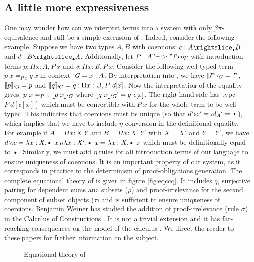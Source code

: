 \documentclass{llncs}
\def\figureshrink{0em}
\begin{document}
\subsection{A little more expressiveness}
One may wonder how can we interpret \Russell terms into a system with only
$\beta\pi$-equivalence and still be a simple extension of \CIC. 
Indeed, consider the following example. Suppose we have two types $A, B$
with coercions: $c : A \suba B$ and $d : B \suba A$. Additionally, let
$P : A "->" Prop$ with introduction terms $p : \Pi x : A, P~x$ and $q :
\Pi x : B, P~x$. Consider the following well-typed \Russell term $p~x
=_{P~x} q~x$ in context $`G = x : A$. By interpretation into \CIC, we
have $\llbracket P \rrbracket_{`G} = P$, $\llbracket p \rrbracket_{`G} = p$ and $\llbracket q \rrbracket_{`G} = q : \Pi x : B,
P~d[x]$. Now the interpretation of the equality gives:
$p~x =_{P~x} \llbracket q~x \rrbracket_{`G}$ where $\llbracket q~x \rrbracket_{`G} `= q~c[x]$. 
The right hand side has type $P~d[c[x]]$ which must be
convertible with $P~x$ for the whole term to be well-typed. This
indicates that coercions must be unique (so that $d `o c `= id_A `=
\ctxdot$), which implies that we have to include $\eta$ 
conversion in the definitional equality. For
example if $A = \Pi x : X.Y$ and $B = \Pi x : X'.Y'$ with $X = X'$ and
$Y = Y'$, we have $d `o c = \lambda x : X. \ctxdot~x `o \lambda x
: X'. \ctxdot~x = \lambda x : X. \ctxdot~x$ which must be definitionally
equal to $\ctxdot$.
Similarly, we must add $\eta$ rules for all introduction terms of our
language to ensure uniqueness of coercions. It is an important
property of our system, as it corresponds in practice to the determinism
of proof-obligations
generation. The complete equational theory of \CICq{} is given in figure
\vref{fig:eqccq}. It includes $\eta$, surjective pairing for dependent
sums and subsets ($\rho$) and proof-irrelevance for the second component
of subset objects ($\tau$) and is sufficient to ensure uniqueness of coercions.
Benjamin Werner has studied the addition of proof-irrelevance (rule
$\sigma$) in the Calculus of Constructions
\cite{Werner:ProofIrrelevance}. It is not a trivial extension and it has
far-reaching consequences on the model of the calculus
\cite{DBLP:conf/types/MiquelW02}. We direct the reader to these papers for further
information on the subject.
\begin{figure}[ht]
  \vspace{\figureshrink}
  \ccqeqarr
  \vspace{\figureshrink}
  \caption{Equational theory of \CICq}
  \label{fig:eqccq}
  \vspace{\figureshrink}
\end{figure}
\end{document}

